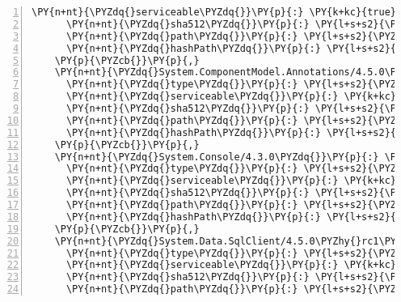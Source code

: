 \begin{Verbatim}[commandchars=\\\{\},numbers=left,firstnumber=1,stepnumber=1,numberblanklines=0]
      \PY{n+nt}{\PYZdq{}serviceable\PYZdq{}}\PY{p}{:} \PY{k+kc}{true}\PY{p}{,}
      \PY{n+nt}{\PYZdq{}sha512\PYZdq{}}\PY{p}{:} \PY{l+s+s2}{\PYZdq{}sha512\PYZhy{}Epx8PoVZR0iuOnJJDzp7pWvdfMMOAvpUo95pC4ScH2mJuXkKA2Y4aR3cG9qt2klHgSons1WFh4kcGW7cSXvrxg==\PYZdq{}}\PY{p}{,}
      \PY{n+nt}{\PYZdq{}path\PYZdq{}}\PY{p}{:} \PY{l+s+s2}{\PYZdq{}system.collections.specialized/4.3.0\PYZdq{}}\PY{p}{,}
      \PY{n+nt}{\PYZdq{}hashPath\PYZdq{}}\PY{p}{:} \PY{l+s+s2}{\PYZdq{}system.collections.specialized.4.3.0.nupkg.sha512\PYZdq{}}
    \PY{p}{\PYZcb{}}\PY{p}{,}
    \PY{n+nt}{\PYZdq{}System.ComponentModel.Annotations/4.5.0\PYZhy{}rc1\PYZdq{}}\PY{p}{:} \PY{p}{\PYZob{}}
      \PY{n+nt}{\PYZdq{}type\PYZdq{}}\PY{p}{:} \PY{l+s+s2}{\PYZdq{}package\PYZdq{}}\PY{p}{,}
      \PY{n+nt}{\PYZdq{}serviceable\PYZdq{}}\PY{p}{:} \PY{k+kc}{true}\PY{p}{,}
      \PY{n+nt}{\PYZdq{}sha512\PYZdq{}}\PY{p}{:} \PY{l+s+s2}{\PYZdq{}sha512\PYZhy{}M4lOyWw6klXzKWBkFIYALHIBnAhstnRZOFuEuRQBIgjVnEVv3dAFZrT452CZS+EUIOR8RmN2Jcx51C/C9iEncw==\PYZdq{}}\PY{p}{,}
      \PY{n+nt}{\PYZdq{}path\PYZdq{}}\PY{p}{:} \PY{l+s+s2}{\PYZdq{}system.componentmodel.annotations/4.5.0\PYZhy{}rc1\PYZdq{}}\PY{p}{,}
      \PY{n+nt}{\PYZdq{}hashPath\PYZdq{}}\PY{p}{:} \PY{l+s+s2}{\PYZdq{}system.componentmodel.annotations.4.5.0\PYZhy{}rc1.nupkg.sha512\PYZdq{}}
    \PY{p}{\PYZcb{}}\PY{p}{,}
    \PY{n+nt}{\PYZdq{}System.Console/4.3.0\PYZdq{}}\PY{p}{:} \PY{p}{\PYZob{}}
      \PY{n+nt}{\PYZdq{}type\PYZdq{}}\PY{p}{:} \PY{l+s+s2}{\PYZdq{}package\PYZdq{}}\PY{p}{,}
      \PY{n+nt}{\PYZdq{}serviceable\PYZdq{}}\PY{p}{:} \PY{k+kc}{true}\PY{p}{,}
      \PY{n+nt}{\PYZdq{}sha512\PYZdq{}}\PY{p}{:} \PY{l+s+s2}{\PYZdq{}sha512\PYZhy{}DHDrIxiqk1h03m6khKWV2X8p/uvN79rgSqpilL6uzpmSfxfU5ng8VcPtW4qsDsQDHiTv6IPV9TmD5M/vElPNLg==\PYZdq{}}\PY{p}{,}
      \PY{n+nt}{\PYZdq{}path\PYZdq{}}\PY{p}{:} \PY{l+s+s2}{\PYZdq{}system.console/4.3.0\PYZdq{}}\PY{p}{,}
      \PY{n+nt}{\PYZdq{}hashPath\PYZdq{}}\PY{p}{:} \PY{l+s+s2}{\PYZdq{}system.console.4.3.0.nupkg.sha512\PYZdq{}}
    \PY{p}{\PYZcb{}}\PY{p}{,}
    \PY{n+nt}{\PYZdq{}System.Data.SqlClient/4.5.0\PYZhy{}rc1\PYZdq{}}\PY{p}{:} \PY{p}{\PYZob{}}
      \PY{n+nt}{\PYZdq{}type\PYZdq{}}\PY{p}{:} \PY{l+s+s2}{\PYZdq{}package\PYZdq{}}\PY{p}{,}
      \PY{n+nt}{\PYZdq{}serviceable\PYZdq{}}\PY{p}{:} \PY{k+kc}{true}\PY{p}{,}
      \PY{n+nt}{\PYZdq{}sha512\PYZdq{}}\PY{p}{:} \PY{l+s+s2}{\PYZdq{}sha512\PYZhy{}hvZtR9A1qK9p0Z1XdPpWcU9L7+w8h4SO54DIoZTtWPfxEkYquW2n7LOXJieQc41UtxXIlF/9/+IrETJ/UyDtVg==\PYZdq{}}\PY{p}{,}
      \PY{n+nt}{\PYZdq{}path\PYZdq{}}\PY{p}{:} \PY{l+s+s2}{\PYZdq{}system.data.sqlclient/4.5.0\PYZhy{}rc1\PYZdq{}}\PY{p}{,}

\end{Verbatim}
